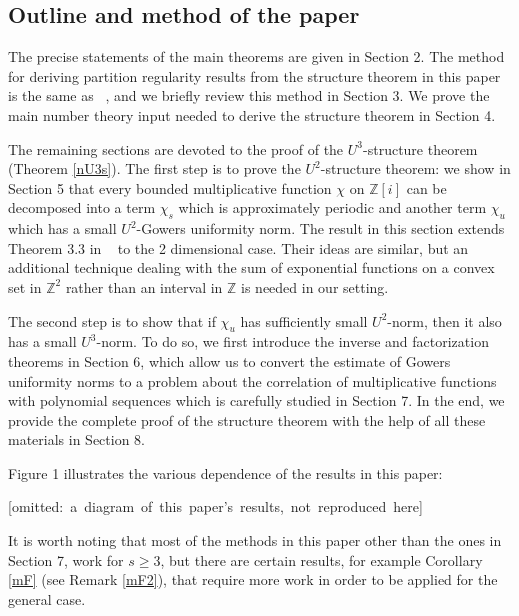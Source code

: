 \documentclass[12pt,amstex]{amsart}
\theoremstyle{definition}
\def \Z {\mathbb{Z}[i]}
\begin{document}
\subsection{Outline and method of the paper}
The precise statements of the main theorems are given in Section 2.
The method for deriving partition regularity results from the structure theorem in this paper is the same as ~\cite{FH}, and we briefly review this method in Section 3. We prove the main number theory input needed to derive the structure theorem in Section 4.

The remaining sections are devoted to the proof of the $U^{3}$-structure theorem (Theorem \ref{nU3s}). The first step is to prove the $U^{2}$-structure theorem: we show in Section 5 that every bounded multiplicative function $\chi$ on $\Z$ can be decomposed into a term $\chi_{s}$ which is approximately periodic and another term $\chi_{u}$ which has a small $U^{2}$-Gowers uniformity norm. The result in this section extends Theorem 3.3 in ~\cite{FH} to the 2 dimensional case. Their ideas are similar, but an additional technique dealing with the sum of exponential functions on a convex set in $\mathbb{Z}^{2}$ rather than an interval in $\mathbb{Z}$ is needed in our setting.

The second step is to show that if $\chi_{u}$ has sufficiently small $U^{2}$-norm, then it also has a small $U^{3}$-norm. To do so, we first introduce the inverse and factorization theorems in Section 6, which allow us to convert the estimate of Gowers uniformity norms to a problem about the correlation of multiplicative functions with polynomial sequences which is carefully studied in Section 7. In the end, we provide the complete proof of the structure theorem with the help of all these materials in Section 8.

Figure 1 illustrates the various dependence of the results in this paper:

\setlength{\unitlength}{0.5mm}
\mbox{[omitted: a diagram of this paper's results, not reproduced here]}

It is worth noting that most of the methods in this paper other than the ones in Section 7, work for $s\geq 3$, but there are certain results, for example Corollary \ref{mF} (see Remark \ref{mF2}), that require more work in order to be applied for the general case.
\end{document}
